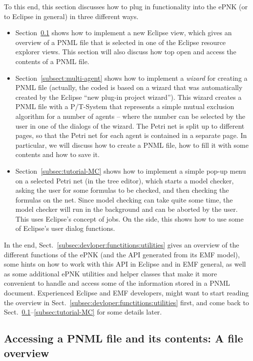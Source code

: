 To this end, this section discusses how to plug in functionality into
the ePNK (or to Eclipse in general) in three different ways.
\begin{itemize}
\item Section~\ref{subsec:file-overview} shows how to implement a new
Eclipse view, which gives an overview of a PNML file that is selected in one of
the Eclipse resource explorer views. This section will also discuss how
top open and access the contents of a PNML file.

\item Section~\ref{subsect:multi-agent} shows how to implement a \emph{wizard}
for creating a PNML file (actually, the coded is based on a wizard that was
automatically created by the Eclipse ``new plug-in project wizard'').
This wizard creates a PNML file with a P/T-System that represents
a simple mutual exclusion algorithm for a number of agents -- where the
number can be selected by the user in one of the dialogs of the wizard.
The Petri net is split up to different pages, so that the Petri net for each
agent is contained in a separate page. In particular, we will discuss how
to create a PNML file, how to fill it with some contents and how to save it.

\item Section~\ref{subsec:tutorial-MC} shows how to implement a
simple pop-up menu on a selected Petri net (in the tree editor), which
starts a model checker, asking the user for some formulas to be checked,
and then checking the formulas on the net. Since model checking can take
quite some time, the model checker will run in the background and can
be aborted by the user. This uses Eclipse's concept of jobs. On the side, this
shows how to use some of Eclipse's user dialog functions.
\end{itemize}

In the end, Sect.~\ref{subsec:devloper:functitions:utilities} gives an overview
of the different functions of the ePNK (and the API generated from its EMF
model), some hints on how to work with this API in Eclipse and in EMF
general, as well as some additional ePNK utilities and helper classes that make it more
convenient to handle and access some of the information stored in a PNML document.
Experienced Eclipse and EMF developers, might want to start reading the overview
in Sect.~\ref{subsec:devloper:functitions:utilities} first, and come back
to Sect.~\ref{subsec:file-overview}--\ref{subsec:tutorial-MC} for some details
later.

\subsection{Accessing a PNML file and its contents: A file overview}
\label{subsec:file-overview}

